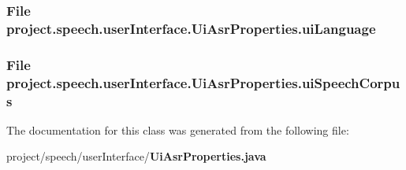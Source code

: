 \subsubsection[{ui\+Language}]{\setlength{\rightskip}{0pt plus 5cm}File project.\+speech.\+user\+Interface.\+Ui\+Asr\+Properties.\+ui\+Language\hspace{0.3cm}{\ttfamily [private]}}\label{classproject_1_1speech_1_1user_interface_1_1_ui_asr_properties_ad891b8ede2e34cc669acf75848720aa4}
\subsubsection[{ui\+Speech\+Corpus}]{\setlength{\rightskip}{0pt plus 5cm}File project.\+speech.\+user\+Interface.\+Ui\+Asr\+Properties.\+ui\+Speech\+Corpus\hspace{0.3cm}{\ttfamily [private]}}\label{classproject_1_1speech_1_1user_interface_1_1_ui_asr_properties_aa121a276dc88a5fe3e7b5edc4f1eea95}


The documentation for this class was generated from the following file\+:\begin{DoxyCompactItemize}
\item 
project/speech/user\+Interface/{\bf Ui\+Asr\+Properties.\+java}\end{DoxyCompactItemize}
